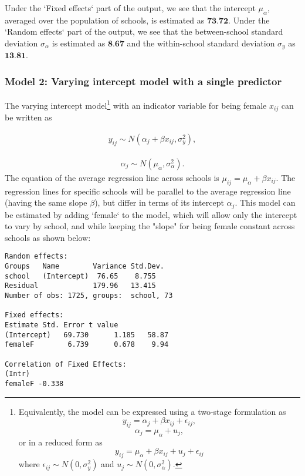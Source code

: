 Under the `Fixed effects` part of the output, we see that the intercept $\mu_{\alpha}$, averaged over the population of schools, is estimated as $\textbf{73.72}$. Under the `Random effects` part of the output, we see that the between-school standard deviation $\sigma_{\alpha}$ is estimated as $\textbf{8.67}$ and the within-school standard deviation $\sigma_{y}$ as $\textbf{13.81}$. 

\subsubsection*{Model 2: Varying intercept model with a single predictor}
The varying intercept model\footnote{Equivalently, the model can be expressed using a two-stage formulation as $$y_{ij} = \alpha_j + \beta x_{ij} +\epsilon_{ij},$$ $$\alpha_j = \mu_\alpha + u_j,$$ or in a reduced form as $$y_{ij} = \mu_\alpha + \beta x_{ij} + u_j + \epsilon_{ij}$$ where $\epsilon_{ij} \sim N(0, \sigma_{y}^{2})$ and $u_{j}\sim N(0, \sigma_{\alpha}^{2})$.} with an indicator variable for being female $x_{ij}$ can be written as

\begin{align}
	y_{ij} \sim N(\alpha_{j}+\beta x_{ij} , \sigma_{y}^{2}),
\end{align}

\begin{align}
	\alpha_{j}\sim N(\mu_{\alpha}, \sigma_{\alpha}^{2}).
\end{align}
The equation of the average regression line across schools is $\mu_{ij}=\mu_{\alpha}+\beta x_{ij}$. The regression lines for specific schools will be parallel to the average regression line (having the same slope $\beta$), but differ in terms of its intercept $\alpha_{j}$. This model can be estimated by adding `female` to the model, which will allow only the intercept to vary by school, and while keeping the "slope" for being female constant across schools as shown below:


\begin{Verbatim}[frame=single]
Random effects:
Groups   Name        Variance Std.Dev.
school   (Intercept)  76.65    8.755  
Residual             179.96   13.415  
Number of obs: 1725, groups:  school, 73

Fixed effects:
Estimate Std. Error t value
(Intercept)   69.730      1.185   58.87
femaleF        6.739      0.678    9.94

Correlation of Fixed Effects:
(Intr)
femaleF -0.338

\end{Verbatim}

